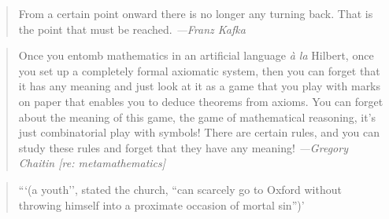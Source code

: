 \documentclass[a4paper]{article}
\begin{document}
\medskip
\begin{quote}
	From a certain point onward there is no longer any turning back.
	That is the point that must be reached. \emph{---Franz Kafka}
\end{quote}

\medskip
\begin{quote}
	Once you entomb mathematics in an artificial language \emph{\`{a} la}
	Hilbert, once you set up a completely formal axiomatic system, then you
	can forget that it has any meaning and just look at it as a game that
	you play with marks on paper that enables you to deduce theorems from
	axioms. You can forget about the meaning of this game, the game of
	mathematical reasoning, it's just combinatorial play with symbols!
	There are certain rules, and you can study these rules and forget that
	they have any meaning!
	\emph{---Gregory Chaitin [re: metamathematics]}~\cite{Chaitin2000}
\end{quote}

\medskip
\begin{quote}
	```(a youth'', stated the church, ``can scarcely go to Oxford without
	throwing himself into a proximate occasion of mortal
	sin'')'~\cite[p.~230]{Snow1991} \cite{Stacpoole1986}
\end{quote}


\end{document}
